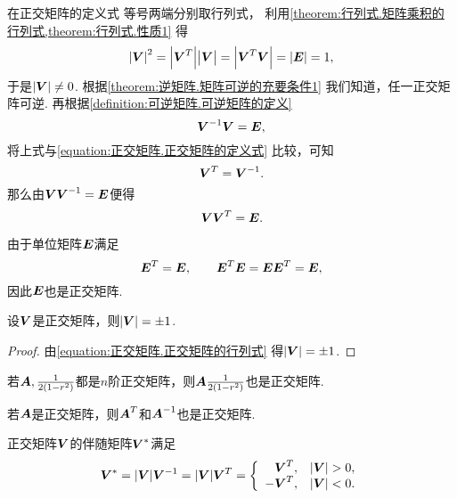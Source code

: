 在正交矩阵的定义式  等号两端分别取行列式，
利用\cref{theorem:行列式.矩阵乘积的行列式,theorem:行列式.性质1} 得
\begin{equation}\label{equation:正交矩阵.正交矩阵的行列式}
	\abs{\Q}^2
	=\abs{\Q^T}\abs{\Q\vphantom{^T}}
	=\abs{\Q^T\Q}
	=\abs{\E}
	=1,
\end{equation}
于是\(\abs{\Q}\neq0\).
根据\cref{theorem:逆矩阵.矩阵可逆的充要条件1} 我们知道，任一正交矩阵可逆.
再根据\cref{definition:可逆矩阵.可逆矩阵的定义}\[
	\Q^{-1}\Q=\E,
\]
将上式与\cref{equation:正交矩阵.正交矩阵的定义式} 比较，可知\begin{equation}
	\Q^T=\Q^{-1}.
\end{equation}
那么由\(\Q\Q^{-1}=\E\)便得\begin{equation}
	\Q\Q^T=\E.
\end{equation}

\begin{example}
由于单位矩阵\(\boldsymbol{E}\)满足\[
	\boldsymbol{E}^T=\boldsymbol{E}, \qquad
	\boldsymbol{E}^T \boldsymbol{E} = \boldsymbol{E} \boldsymbol{E}^T = \boldsymbol{E},
\]
因此\(\boldsymbol{E}\)也是正交矩阵.
\end{example}

\begin{property}
设\(\Q\)是正交矩阵，则\(\abs{\Q} = \pm1\).
\begin{proof}
由\cref{equation:正交矩阵.正交矩阵的行列式}
得\(\abs{\Q} = \pm 1\).
\end{proof}
\end{property}

\begin{property}
若\(\boldsymbol{A},\frac{1}{2(1-r^2)}\)都是\(n\)阶正交矩阵，则\(\boldsymbol{A}\frac{1}{2(1-r^2)}\)也是正交矩阵.
\end{property}

\begin{property}
若\(\boldsymbol{A}\)是正交矩阵，则\(\boldsymbol{A}^T\)和\(\boldsymbol{A}^{-1}\)也是正交矩阵.
\end{property}

\begin{theorem}
正交矩阵\(\Q\)的伴随矩阵\(\Q^*\)满足\[
	\Q^* = \abs{\Q} \Q^{-1}
	= \abs{\Q} \Q^T
	= \left\{ \begin{array}{rc}
		\Q^T, & \abs{\Q}>0, \\
		-\Q^T, & \abs{\Q}<0.
	\end{array} \right.
\]
\end{theorem}

